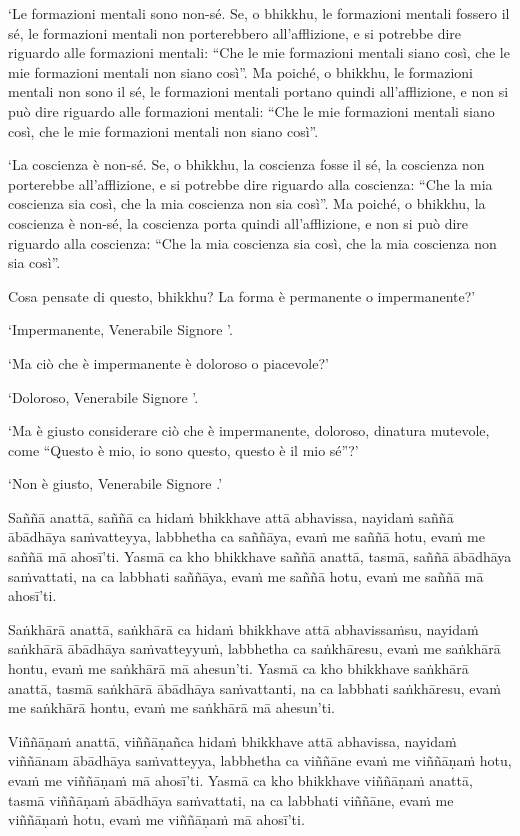‘Le formazioni mentali sono non-sé. Se, o bhikkhu, le formazioni mentali fossero il
sé, le formazioni mentali non porterebbero all'afflizione, e si potrebbe dire riguardo
alle formazioni mentali: “Che le mie formazioni mentali siano così, che le mie
formazioni mentali non siano così”. Ma poiché, o bhikkhu, le formazioni mentali non
sono il sé, le formazioni mentali portano quindi all'afflizione, e non si può dire
riguardo alle formazioni mentali: “Che le mie formazioni mentali siano così, che le mie
formazioni mentali non siano così”.

‘La coscienza è non-sé. Se, o bhikkhu, la coscienza fosse il sé, la coscienza non
porterebbe all'afflizione, e si potrebbe dire riguardo alla coscienza: “Che la mia
coscienza sia così, che la mia coscienza non sia così”. Ma poiché, o bhikkhu, la
coscienza è non-sé, la coscienza porta quindi all'afflizione, e non si può dire
riguardo alla coscienza: “Che la mia coscienza sia così, che la mia coscienza non sia
così”.


Cosa pensate di questo, bhikkhu? La forma è permanente o
impermanente?’


‘Impermanente, Venerabile Signore ’.

‘Ma ciò che è impermanente è doloroso o piacevole?’

‘Doloroso, Venerabile Signore ’.

‘Ma è giusto considerare ciò che è impermanente, doloroso, dinatura mutevole, come
“Questo è mio, io sono questo, questo è il mio sé”?’

‘Non è giusto, Venerabile Signore .’

\clearpage

\paliText
\markboth{\paliTitle}{\rightmark}

Saññā anattā, saññā ca hidaṁ bhikkhave attā abhavissa, nayidaṁ saññā ābādhāya
saṁvatteyya, labbhetha ca saññāya, evaṁ me saññā hotu, evaṁ me saññā mā
ahosī'ti. Yasmā ca kho bhikkhave saññā anattā, tasmā, saññā ābādhāya saṁvattati,
na ca labbhati saññāya, evaṁ me saññā hotu, evaṁ me saññā mā ahosī'ti.

Saṅkhārā anattā, saṅkhārā ca hidaṁ bhikkhave attā abhavissaṁsu, nayidaṁ saṅkhārā
ābādhāya saṁvatteyyuṁ, labbhetha ca saṅkhāresu, evaṁ me saṅkhārā hontu, evaṁ me
saṅkhārā mā ahesun'ti. Yasmā ca kho bhikkhave saṅkhārā anattā, tasmā saṅkhārā
ābādhāya saṁvattanti, na ca labbhati saṅkhāresu, evaṁ me saṅkhārā hontu, evaṁ me
saṅkhārā mā ahesun'ti.

Viññāṇaṁ anattā, viññāṇañca hidaṁ bhikkhave attā abhavissa, nayidaṁ viññānam
ābādhāya saṁvatteyya, labbhetha ca viññāne evaṁ me viññāṇaṁ hotu, evaṁ me
viññāṇaṁ mā ahosī'ti. Yasmā ca kho bhikkhave viññāṇaṁ anattā, tasmā viññāṇaṁ
ābādhāya saṁvattati, na ca labbhati viññāne, evaṁ me viññāṇaṁ hotu, evaṁ me
viññāṇaṁ mā ahosī'ti.

